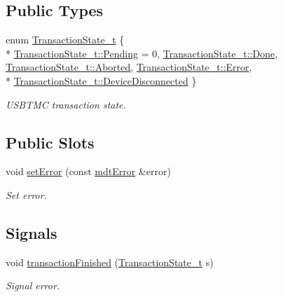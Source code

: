 \subsection*{Public Types}
\begin{DoxyCompactItemize}
\item 
enum \hyperlink{classmdt_usbtmc_port_a95543679f3981f4a061bb46731731868}{Transaction\-State\-\_\-t} \{ \\*
\hyperlink{classmdt_usbtmc_port_a95543679f3981f4a061bb46731731868a2d13df6f8b5e4c5af9f87e0dc39df69d}{Transaction\-State\-\_\-t\-::\-Pending} = 0, 
\hyperlink{classmdt_usbtmc_port_a95543679f3981f4a061bb46731731868af92965e2c8a7afb3c1b9a5c09a263636}{Transaction\-State\-\_\-t\-::\-Done}, 
\hyperlink{classmdt_usbtmc_port_a95543679f3981f4a061bb46731731868a721c28f4c74928cc9e0bb3fef345e408}{Transaction\-State\-\_\-t\-::\-Aborted}, 
\hyperlink{classmdt_usbtmc_port_a95543679f3981f4a061bb46731731868a902b0d55fddef6f8d651fe1035b7d4bd}{Transaction\-State\-\_\-t\-::\-Error}, 
\\*
\hyperlink{classmdt_usbtmc_port_a95543679f3981f4a061bb46731731868a97a08776c0f8ffd1c0b692f8f0e328b0}{Transaction\-State\-\_\-t\-::\-Device\-Disconnected}
 \}
\begin{DoxyCompactList}\small\item\em U\-S\-B\-T\-M\-C transaction state. \end{DoxyCompactList}\end{DoxyCompactItemize}
\subsection*{Public Slots}
\begin{DoxyCompactItemize}
\item 
void \hyperlink{classmdt_usbtmc_port_a4f727be1d99c3ea46c68f781261a0f24}{set\-Error} (const \hyperlink{classmdt_error}{mdt\-Error} \&error)
\begin{DoxyCompactList}\small\item\em Set error. \end{DoxyCompactList}\end{DoxyCompactItemize}
\subsection*{Signals}
\begin{DoxyCompactItemize}
\item 
void \hyperlink{classmdt_usbtmc_port_ac2d4dc739be5c42c664e40ff7bb74132}{transaction\-Finished} (\hyperlink{classmdt_usbtmc_port_a95543679f3981f4a061bb46731731868}{Transaction\-State\-\_\-t} s)
\begin{DoxyCompactList}\small\item\em Signal error. \end{DoxyCompactList}\end{DoxyCompactItemize}
